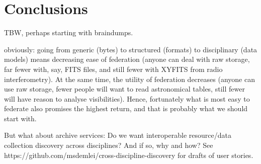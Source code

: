 \section{Conclusions}
\label{sect:conclusions}

TBW, perhaps starting with braindumps.

obviously: going from generic (bytes) to structured (formats) to
disciplinary (data models) means decreasing ease of federation (anyone
can deal with raw storage, far fewer with, say, FITS files, and still
fewer with XYFITS from radio interferometry).  At the same time, the
utility of federation decreases (anyone can use raw storage, fewer
people will want to read astronomical tables, still fewer will have
reason to analyse visibilities).  Hence, fortunately what is most easy
to federate also promises the highest return, and that is probably
what we should start with.

But what about archive services: Do we want interoperable resource/data
collection discovery across disciplines?  And if so, why and how?  See
https://github.com/msdemlei/cross-discipline-discovery for drafts of
user stories.
